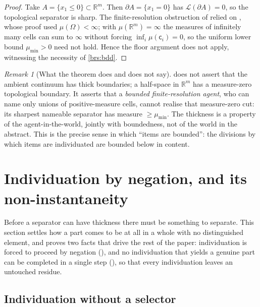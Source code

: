 \documentclass[11pt,twocolumn,a4paper]{article}
\theoremstyle{thmstyle}
\theoremstyle{definition}
\theoremstyle{remark}
\newtheorem{remark}[theorem]{Remark}
\newcommand{\R}{\mathbb{R}}
\newcommand{\Space}{\Omega}
\newcommand{\Bdy}{\partial}
\newcommand{\Leb}{\mathcal{L}}
\newcommand{\cell}{\mathsf{c}}
\begin{document}
\begin{proof}
Take $A=\{x_1\le0\}\subset\R^m$. Then $\Bdy A=\{x_1=0\}$ has
$\Leb(\Bdy A)=0$, so the topological separator is sharp. The finite-resolution
obstruction of  relied on , whose
proof used $\mu(\Space)<\infty$; with $\mu(\R^m)=\infty$ the measures of
infinitely many cells can sum to $\infty$ without forcing
$\inf_i\mu(\cell_i)=0$, so the uniform lower bound $\mu_{\min}>0$ need not hold.
Hence the floor argument does not apply, witnessing the necessity of
\ref{brs:bdd}.
\end{proof}

\begin{remark}[What the theorem does and does not say]
\label{rem:thickness-scope}
 does not assert that the ambient continuum has thick
boundaries; a half-space in $\R^m$ has a measure-zero topological boundary. It
asserts that a \emph{bounded finite-resolution agent}, who can name only unions
of positive-measure cells, cannot realise that measure-zero cut: its sharpest
nameable separator has measure $\ge\mu_{\min}$. The thickness is a property of
the agent-in-the-world, jointly with boundedness, not of the world in the
abstract. This is the precise sense in which ``items are bounded'': the divisions
by which items are individuated are bounded below in content.
\end{remark}


\section{Individuation by negation, and its non-instantaneity}
\label{sec:negation}

Before a separator can have thickness there must be something to separate. This
section settles how a part comes to be at all in a whole with no distinguished
element, and proves two facts that drive the rest of the paper: individuation is
forced to proceed by negation (), and no individuation
that yields a genuine part can be completed in a single step
(), so that every individuation leaves an untouched
residue.

\subsection{Individuation without a selector}
\end{document}
